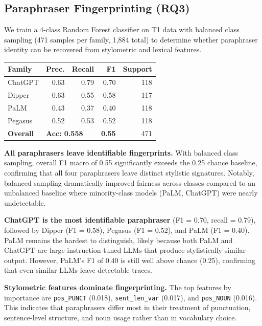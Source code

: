 \documentclass[10pt,twocolumn]{article}
\begin{document}
\subsection{Paraphraser Fingerprinting (RQ3)}

We train a 4-class Random Forest classifier on T1 data with balanced
class sampling (471 samples per family, 1,884 total) to determine whether
paraphraser identity can be recovered from stylometric and lexical features.

\begin{center}
\small
\begin{tabular}{lrrrr}
\toprule
\textbf{Family} & \textbf{Prec.} & \textbf{Recall} & \textbf{F1} & \textbf{Support} \\
\midrule
ChatGPT & 0.63 & 0.79 & 0.70 & 118 \\
Dipper  & 0.63 & 0.55 & 0.58 & 117 \\
PaLM    & 0.43 & 0.37 & 0.40 & 118 \\
Pegasus & 0.52 & 0.53 & 0.52 & 118 \\
\midrule
\textbf{Overall} & \multicolumn{2}{l}{\textbf{Acc: 0.558}} & \textbf{0.55} & 471 \\
\bottomrule
\end{tabular}
\label{tab:fingerprint}
\end{center}

\textbf{All paraphrasers leave identifiable fingerprints.} With balanced
class sampling, overall F1 macro of 0.55 significantly exceeds the 0.25
chance baseline, confirming that all four paraphrasers leave distinct
stylistic signatures. Notably, balanced sampling dramatically improved
fairness across classes compared to an unbalanced baseline where
minority-class models (PaLM, ChatGPT) were nearly undetectable.

\textbf{ChatGPT is the most identifiable paraphraser} (F1 = 0.70, recall =
0.79), followed by Dipper (F1 = 0.58), Pegasus (F1 = 0.52), and PaLM
(F1 = 0.40). PaLM remains the hardest to distinguish, likely because
both PaLM and ChatGPT are large instruction-tuned LLMs that produce
stylistically similar output. However, PaLM's F1 of 0.40 is still well
above chance (0.25), confirming that even similar LLMs leave detectable
traces.

\textbf{Stylometric features dominate fingerprinting.} The top features by
importance are \texttt{pos\_PUNCT} (0.018), \texttt{sent\_len\_var}
(0.017), and \texttt{pos\_NOUN} (0.016). This indicates that paraphrasers
differ most in their treatment of punctuation, sentence-level structure,
and noun usage rather than in vocabulary choice.
\end{document}
